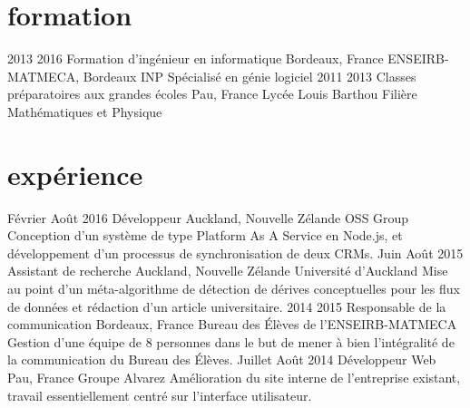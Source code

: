 \section{formation}
\begin{experiencelist}
\entry
    {2013}
    {2016}
    {Formation d'ingénieur en informatique}
    {Bordeaux, France}
    {ENSEIRB-MATMECA, Bordeaux INP}
    {
        Spécialisé en génie logiciel
    }
\entry
    {2011}
    {2013}
    {Classes préparatoires aux grandes écoles}
    {Pau, France}
    {Lycée Louis Barthou}
    {
        Filière Mathématiques et Physique
    }
\end{experiencelist}



\section{expérience}
\begin{experiencelist}
\entry
    {Février}
    {Août 2016}
    {Développeur}
    {Auckland, Nouvelle Zélande}
    {OSS Group}
    {
        Conception d'un système de type Platform As A Service en Node.js, et
        développement d'un processus de synchronisation de deux CRMs.
    }
\entry
    {Juin}
    {Août 2015}
    {Assistant de recherche}
    {Auckland, Nouvelle Zélande}
    {Université d'Auckland}
    {
        Mise au point d'un méta-algorithme de détection de dérives conceptuelles
        pour les flux de données et rédaction d'un article universitaire.
    }
\entry
    {2014}
    {2015}
    {Responsable de la communication}
    {Bordeaux, France}
    {Bureau des Élèves de l'ENSEIRB-MATMECA}
    {
        Gestion d'une équipe de 8 personnes dans le but de mener à bien
        l'intégralité de la communication du Bureau des Élèves.
    }
\entry
    {Juillet}
    {Août 2014}
    {Développeur Web}
    {Pau, France}
    {Groupe Alvarez}
    {
        Amélioration du site interne de l'entreprise existant, travail
        essentiellement centré sur l'interface utilisateur.
    }
\end{experiencelist}



